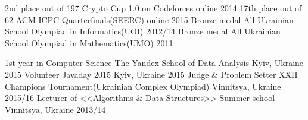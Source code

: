 






\begin{cvhonors}
  \cvhonor
    {2nd place out of 197}
    {Crypto Cup 1.0 on Codeforces}
    {online}
    {2014}
  \cvhonor
    {17th place out of 62}
    {ACM ICPC Quarterfinals(SEERC)}
    {online}
    {2015}
  \cvhonor
    {Bronze medal}
    {All Ukrainian School Olympiad in Informatics(UOI)}
    {}
    {2012/14}
  \cvhonor
    {Bronze medal}
    {All Ukrainian School Olympiad in Mathematics(UMO)}
    {}
    {2011}
\end{cvhonors}

\begin{cvhonors}
  \cvhonor
    {1st year in Computer Science}
    {The Yandex School of Data Analysis}
    {Kyiv, Ukraine}
    {2015}
  \cvhonor
    {Volunteer}
    {Javaday 2015}
    {Kyiv, Ukraine}
    {2015}
  \cvhonor
    {Judge \& Problem Setter}
    {XXII Champions Tournament(Ukrainian Complex Olympiad)}
    {Vinnitsya, Ukraine}
    {2015/16}
  \cvhonor
    {Lecturer of <<Algorithms \& Data Structures>>}
    {Summer school}
    {Vinnitsya, Ukraine}
    {2013/14}
\end{cvhonors}